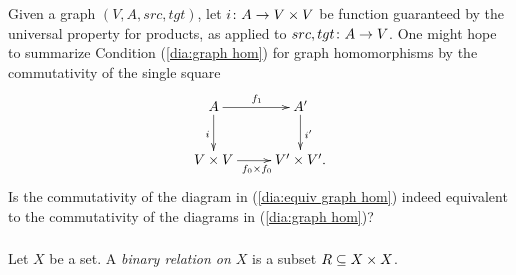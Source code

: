 \documentclass[CT4S-EN-RU]{subfiles}
\begin{document}
\begin{exerciseENG}\label{exc:single condition for graph hom}
Given a graph $(V,A,src,tgt)$, let $i\taking A\to V\times V$ be function guaranteed by the universal property for products, as applied to $src,tgt\taking A\to V$. One might hope to summarize Condition (\ref{dia:graph hom}) for graph homomorphisms by the commutativity of the single square 
\begin{align}\label{dia:equiv graph hom}
\xymatrix{A\ar[r]^{f_1}\ar[d]_{i}&A'\ar[d]^{i'}\\V\times V\ar[r]_{f_0\times f_0}&V'\times V'.}
\end{align}
Is the commutativity of the diagram in (\ref{dia:equiv graph hom}) indeed equivalent to the commutativity of the diagrams in (\ref{dia:graph hom})?
\end{exerciseENG}

\begin{exerciseRUS}\label{exc:single condition for graph hom}
\end{exerciseRUS}


\subsubsection{}

\begin{definitionENG}\label{def:binary relation}
Let $X$ be a set. A {\em binary relation on $X$} is a subset $R\ss X\times X$. 
\end{definitionENG}

\begin{definitionRUS}\label{def:binary relation}
\end{definitionRUS}
\end{document}
